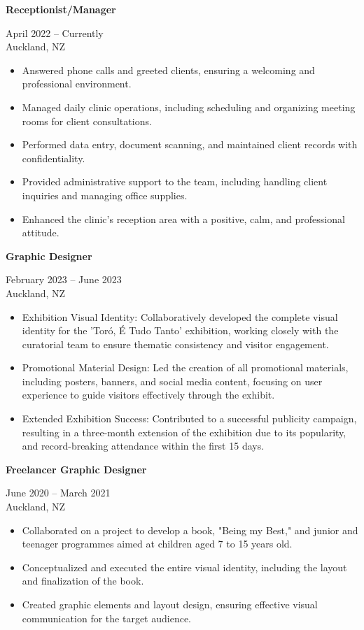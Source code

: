 \documentclass[10pt,a4paper,ragged2e,withhyper]{altacv}
\renewcommand{\cvevent}[4]{%
  \textbf{#1} %
  \hfill %
  \begin{minipage}[t]{.5\linewidth}
    \raggedleft %
    \small#3 %
    \\ %
    #4 %
  \end{minipage}
  \vspace{\baselineskip} %
}
\begin{document}

\cvevent{Receptionist/Manager}{Bonita Brazilian Beauty}{April 2022 -- Currently}{Auckland, NZ}
\begin{itemize}
  \item Answered phone calls and greeted clients, ensuring a welcoming and professional environment.
  \item Managed daily clinic operations, including scheduling and organizing meeting rooms for client consultations.
  \item Performed data entry, document scanning, and maintained client records with confidentiality.
  \item Provided administrative support to the team, including handling client inquiries and managing office supplies.
  \item Enhanced the clinic's reception area with a positive, calm, and professional attitude.
\end{itemize}

\divider

\cvevent{Graphic Designer}{Auckland War Memorial Museum (Contract)}{February 2023 -- June 2023}{Auckland, NZ}
\begin{itemize}
  \item Exhibition Visual Identity: Collaboratively developed the complete visual identity for the 'Toró, É Tudo Tanto' exhibition, working closely with the curatorial team to ensure thematic consistency and visitor engagement.
  \item Promotional Material Design: Led the creation of all promotional materials, including posters, banners, and social media content, focusing on user experience to guide visitors effectively through the exhibit.
  \item Extended Exhibition Success: Contributed to a successful publicity campaign, resulting in a three-month extension of the exhibition due to its popularity, and record-breaking attendance within the first 15 days.
\end{itemize}

\divider

\cvevent{Freelancer Graphic Designer}{Sue Lyon}{June 2020 -- March 2021}{Auckland, NZ}
\begin{itemize}
  \item Collaborated on a project to develop a book, "Being my Best," and junior and teenager programmes aimed at children aged 7 to 15 years old.
  \item Conceptualized and executed the entire visual identity, including the layout and finalization of the book.
  \item Created graphic elements and layout design, ensuring effective visual communication for the target audience.
\end{itemize}
\end{document}
